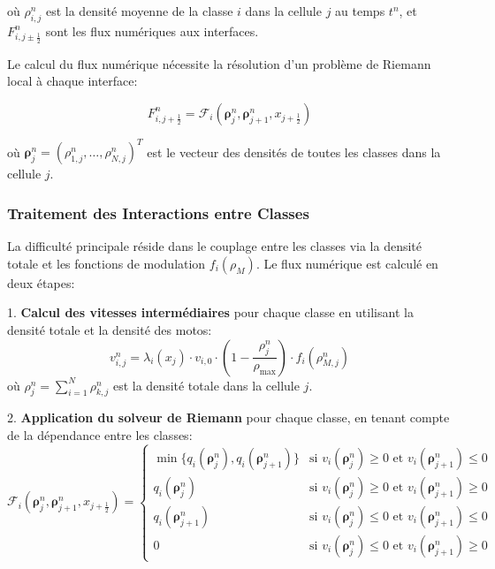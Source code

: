 où $\rho_{i,j}^{n}$ est la densité moyenne de la classe $i$ dans la cellule $j$ au temps $t^n$, et $F_{i,j\pm\frac{1}{2}}^n$ sont les flux numériques aux interfaces.

Le calcul du flux numérique nécessite la résolution d'un problème de Riemann local à chaque interface:

\begin{equation}
F_{i,j+\frac{1}{2}}^n = \mathcal{F}_i\left(\boldsymbol{\rho}^n_j, \boldsymbol{\rho}^n_{j+1}, x_{j+\frac{1}{2}}\right)
\end{equation}

où $\boldsymbol{\rho}^n_j = (\rho_{1,j}^n, \ldots, \rho_{N,j}^n)^T$ est le vecteur des densités de toutes les classes dans la cellule $j$.

\subsubsection{Traitement des Interactions entre Classes}
\label{subsubsec:traitement_interactions}

La difficulté principale réside dans le couplage entre les classes via la densité totale \rho et les fonctions de modulation $f_i(\rho_M)$. Le flux numérique est calculé en deux étapes:

1. \textbf{Calcul des vitesses intermédiaires} pour chaque classe en utilisant la densité totale et la densité des motos:
\begin{equation}
v_{i,j}^n = \lambda_i(x_j) \cdot v_{i,0} \cdot \left(1 - \frac{\rho_j^n}{\rho_{\max}}\right) \cdot f_i\left(\rho_{M,j}^n\right)
\end{equation}
où $\rho_j^n = \sum_{i=1}^N \rho_{k,j}^n$ est la densité totale dans la cellule $j$.

2. \textbf{Application du solveur de Riemann} pour chaque classe, en tenant compte de la dépendance entre les classes:
\begin{equation}
\mathcal{F}_i\left(\boldsymbol{\rho}^n_j, \boldsymbol{\rho}^n_{j+1}, x_{j+\frac{1}{2}}\right) = 
\begin{cases}
\min\{q_i(\boldsymbol{\rho}^n_j), q_i(\boldsymbol{\rho}^n_{j+1})\} & \text{si } v_i(\boldsymbol{\rho}^n_j) \geq 0 \text{ et } v_i(\boldsymbol{\rho}^n_{j+1}) \leq 0 \\
q_i(\boldsymbol{\rho}^n_j) & \text{si } v_i(\boldsymbol{\rho}^n_j) \geq 0 \text{ et } v_i(\boldsymbol{\rho}^n_{j+1}) \geq 0 \\
q_i(\boldsymbol{\rho}^n_{j+1}) & \text{si } v_i(\boldsymbol{\rho}^n_j) \leq 0 \text{ et } v_i(\boldsymbol{\rho}^n_{j+1}) \leq 0 \\
0 & \text{si } v_i(\boldsymbol{\rho}^n_j) \leq 0 \text{ et } v_i(\boldsymbol{\rho}^n_{j+1}) \geq 0
\end{cases}
\end{equation}

